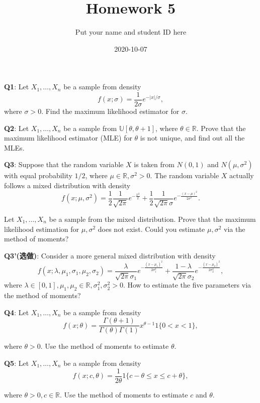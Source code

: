 \documentclass[]{article}
\title{Homework 5}
\author{Put your name and student ID here}
\date{2020-10-07}
\begin{document}
\maketitle

\textbf{Q1}: Let \(X_1,\dots,X_n\) be a sample from density
\[f(x;\sigma)=\frac{1}{2\sigma} e^{-|x|/\sigma},\] where \(\sigma>0\).
Find the maximum likelihood estimator for \(\sigma\).

\textbf{Q2}: Let \(X_1,\dots,X_n\) be a sample from
\(\mathbb{U}[\theta,\theta+1]\), where \(\theta\in\mathbb{R}\). Prove
that the maximum likelihood estimator (MLE) for \(\theta\) is not
unique, and find out all the MLEs.

\textbf{Q3}: Suppose that the random variable \(X\) is taken from
\(N(0,1)\) and \(N(\mu,\sigma^2)\) with equal probability \(1/2\), where
\(\mu\in \mathbb{R},\sigma^2>0\). The random variable \(X\) actually
follows a mixed distribution with density
\[f(x;\mu,\sigma^2) = \frac 12\frac{1}{\sqrt{2\pi}}e^{-\frac {x^2}2}+\frac 12\frac{1}{\sqrt{2\pi}\sigma}e^{-\frac{(x-\mu)^2}{2\sigma^2}}.\]

Let \(X_1,\dots,X_n\) be a sample from the mixed distribution. Prove
that the maximum likelihood estimation for \(\mu,\sigma^2\) does not
exist. Could you estimate \(\mu,\sigma^2\) via the method of moments?

\textbf{Q3'(选做)}: Consider a more general mixed distribution with
density
\[f(x;\lambda,\mu_1,\sigma_1,\mu_2,\sigma_2)=\frac{\lambda}{\sqrt{2\pi}\sigma_1}e^{-\frac{(x-\mu_1)^2}{2\sigma_1^2}}+\frac{1-\lambda}{\sqrt{2\pi}\sigma_2}e^{-\frac{(x-\mu_2)^2}{2\sigma_2^2}},\]
where
\(\lambda\in[0,1],\mu_1,\mu_2\in \mathbb{R},\sigma_1^2,\sigma_2^2>0\).
How to estimate the five parameters via the method of moments?

\textbf{Q4}: Let \(X_1,\dots,X_n\) be a sample from density
\[f(x;\theta)=\frac{\Gamma(\theta+1)}{\Gamma(\theta)\Gamma(1)}x^{\theta-1}1\{0< x< 1\},\]

where \(\theta>0\). Use the method of moments to estimate \(\theta\).

\textbf{Q5}: Let \(X_1,\dots,X_n\) be a sample from density
\[f(x;c,\theta)=\frac{1}{2\theta}1\{c-\theta\le x\le c+\theta\},\]

where \(\theta>0,c\in\mathbb{R}\). Use the method of moments to estimate
\(c\) and \(\theta\).
\end{document}
